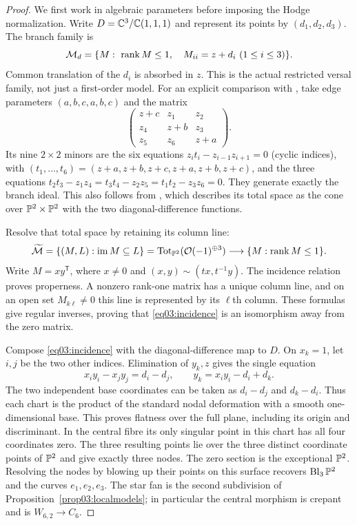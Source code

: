\begin{proof}
We first work in algebraic parameters before imposing the Hodge
normalization.  Write $D=\mathbb{C}^3/\mathbb{C}(1,1,1)$ and represent its points
by $(d_1,d_2,d_3)$.  The branch family is
\begin{equation}\label{eq03:matrixfamily}
 \mathcal M_d=\{M:\ \operatorname{rank} M\leq1,\quad M_{ii}=z+d_i\ (1\leq i\leq3)\}.
\end{equation}
Common translation of the $d_i$ is absorbed in $z$.  This is the
actual restricted versal family, not just a first-order model.
For an explicit comparison with \cite[Section~5.6]{Altmann97}, take
edge parameters $(a,b,c,a,b,c)$ and the matrix
\[
 \begin{pmatrix}
 z+c&z_1&z_2\\ z_4&z+b&z_3\\ z_5&z_6&z+a
 \end{pmatrix}.
\]
Its nine $2\times2$ minors are the six equations
$z_it_i-z_{i-1}z_{i+1}=0$ (cyclic indices), with
$(t_1,\ldots,t_6)=(z+a,z+b,z+c,z+a,z+b,z+c)$,
and the three equations
$t_2t_3-z_1z_4=t_3t_4-z_2z_5=t_1t_2-z_3z_6=0$.
They generate exactly the branch ideal.  This also follows from
\cite[Section~8.2(ii)]{Altmann97}, which describes its total space
as the cone over $\mathbb{P}^2\times\mathbb{P}^2$ with the two diagonal-difference
functions.

Resolve that total space by retaining its column line:
\begin{equation}\label{eq03:incidence}
 \widetilde{\mathcal M}
 =\{(M,L):\operatorname{im}M\subseteq L\}
 =\operatorname{Tot}_{\mathbb{P}^2}(\mathcal{O}(-1)^{\oplus3})
 \longrightarrow\{M:\operatorname{rank} M\leq1\}.
\end{equation}
Write $M=xy^{\mathsf T}$, where $x\ne0$ and
$(x,y)\sim(tx,t^{-1}y)$.  The incidence relation proves properness.
A nonzero rank-one matrix has a unique column line, and on an open
set $M_{k\ell}\ne0$ this line is represented by its $\ell$th column.
These formulas give regular inverses, proving that
\eqref{eq03:incidence} is an isomorphism away from the zero matrix.

Compose \eqref{eq03:incidence} with the diagonal-difference map to
$D$.  On $x_k=1$, let $i,j$ be the two other indices.  Elimination of
$y_k,z$ gives the single equation
\begin{equation}\label{eq03:a2chart}
 x_i y_i-x_j y_j=d_i-d_j,
 \qquad y_k=x_i y_i-d_i+d_k.
\end{equation}
The two independent base coordinates can be taken as $d_i-d_j$
and $d_k-d_i$.  Thus each chart is the product of the standard nodal
deformation with a smooth one-dimensional base.  This proves
flatness over the full plane, including its origin and discriminant.
In the central fibre its only singular point in this chart has all
four coordinates zero.  The three resulting points lie over the
three distinct coordinate points of $\mathbb{P}^2$ and give exactly three
nodes.  The zero section is the exceptional $\mathbb{P}^2$.  Resolving the
nodes by blowing up their points on this surface recovers
$\operatorname{Bl}_3\mathbb{P}^2$ and the curves $e_1,e_2,e_3$.
The star fan is the second subdivision of
Proposition~\ref{prop03:localmodels}; in particular the central
morphism is crepant and is $W_{6,2}\to C_6$.


\end{proof}
